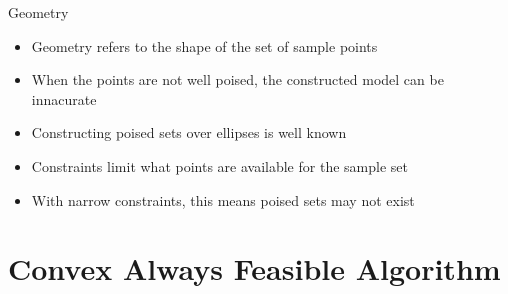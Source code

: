 \documentclass{beamer}
\begin{document}
\begin{frame}{Geometry}
    \begin{itemize}
        \item<1, 2, 3> Geometry refers to the shape of the set of sample points
        \item<1, 2, 3> When the points are not well poised, the constructed model can be innacurate \\
        \item<3> Constructing poised sets over ellipses is well known
        \item<3> Constraints limit what points are available for the sample set
        \item<3> With narrow constraints, this means poised sets may not exist
    \end{itemize}
\end{frame}





\section{Convex Always Feasible Algorithm}
\end{document}
